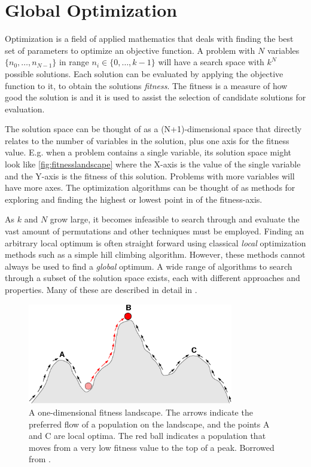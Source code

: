 \section{Global Optimization}

Optimization is a field of applied mathematics that deals with finding the best
set of parameters to optimize an objective function. A problem with $N$
variables $\{n_0, \dots, n_{N-1}\}$ in range $n_i \in \{0, \dots, k-1\}$ will
have a search space with $k^N$ possible solutions. Each solution can be
evaluated by applying the objective function to it, to obtain the solutions
\emph{fitness}. The fitness is a measure of how good the solution is and it is
used to assist the selection of candidate solutions for evaluation.

The solution space can be thought of as a (N+1)-dimensional space that directly
relates to the number of variables in the solution, plus one axis for the
fitness value. E.g. when a problem contains a single variable, its solution
space might look like \autoref{fig:fitnesslandscape} where the X-axis is the
value of the single variable and the Y-axis is the fitness of this solution.
Problems with more variables will have more axes. The optimization algorithms
can be thought of as methods for exploring and finding the highest or lowest
point in of the fitness-axis.

As $k$ and $N$ grow large, it becomes infeasible to search through and
evaluate the vast amount of permutations and other techniques must be employed.
Finding an arbitrary local optimum is often straight forward using classical
\emph{local} optimization methods such as a simple hill climbing algorithm.
However, these methods cannot always be used to find a \emph{global} optimum. A wide
range of algorithms to search through a subset of the solution space exists,
each with different approaches and properties. Many of these are described in
detail in \cite{russellnorvig}.

\begin{figure}[bth]
    \centering
    \includegraphics[width=0.8\textwidth]{figs/Fitness-landscape-cartoon.png}
    \caption{A one-dimensional fitness landscape. The arrows indicate the
        preferred flow of a population on the landscape, and the points A and C
        are local optima. The red ball indicates a population that moves from a
        very low fitness value to the top of a peak. Borrowed from \cite{wikifitnesslandscape}.}
    \label{fig:fitnesslandscape}
\end{figure}

